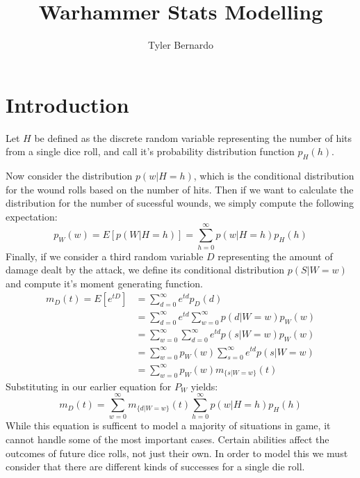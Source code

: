 \documentclass{article}
\title{Warhammer Stats Modelling}
\author{Tyler Bernardo}
\date{}
\begin{document}
\maketitle
\section{Introduction}
Let $H$ be defined as the discrete random variable representing the number of hits from a single dice roll, and call it's probability distribution function $p_H(h)$.

Now consider the distribution $p(w | H = h)$, which is the conditional distribution for the wound rolls based on the number of hits. Then if we want to calculate the distribution for the number of sucessful wounds, we simply compute the following expectation:
$$p_W(w) = E[p(W | H=h)] = \sum_{h=0}^{\infty} p(w|H = h)p_H(h)$$
Finally, if we consider a third random variable $D$ representing the amount of damage dealt by the attack, we define its conditional distribution $p(S | W = w)$ and compute it's moment generating function.
\begin{align*}
    m_D(t) = E[e^{tD}] &= \sum_{d=0}^\infty e^{td} p_D(d)\\
    &= \sum_{d=0}^\infty e^{td} \sum_{w = 0}^\infty p(d|W = w)p_W(w) \\
    &= \sum_{w = 0}^\infty \sum_{d=0}^\infty  e^{td} p(s|W = w)p_W(w) \\
    &= \sum_{w = 0}^\infty p_W(w) \sum_{s=0}^\infty  e^{td} p(s|W = w) \\
    &= \sum_{w=0}^\infty p_W(w) m_{\{s|W = w\}}(t)
\end{align*}
Substituting in our earlier equation for $P_W$ yields:
\begin{equation}
    m_D(t) = \sum_{w=0}^\infty m_{\{d|W = w\}}(t) \sum_{h=0}^\infty p(w|H = h)p_H(h)
\end{equation}
While this equation is sufficent to model a majority of situations in game, it cannot handle some of the most important cases. Certain abilities affect the outcomes of future dice rolls, not just their own. In order to model this we must consider that there are different kinds of successes for a single die roll.
\end{document}
